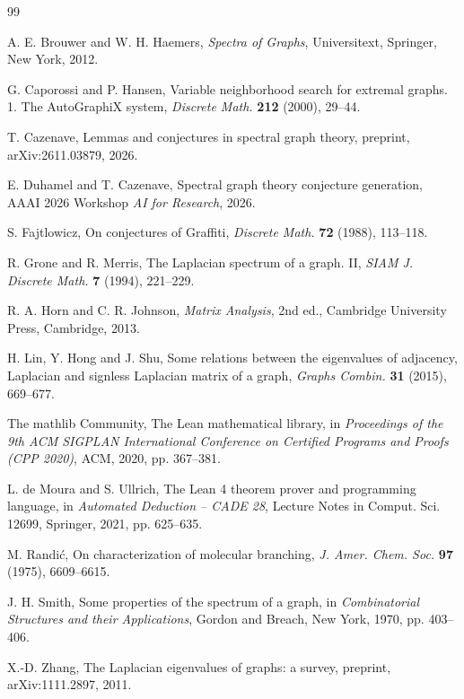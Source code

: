 \documentclass[11pt]{amsart}
\theoremstyle{definition}
\theoremstyle{remark}
\begin{document}
\begin{thebibliography}{99}

A. E. Brouwer and W. H. Haemers, \emph{Spectra of Graphs}, Universitext, Springer, New York,
2012.

G. Caporossi and P. Hansen, Variable neighborhood search for extremal graphs. 1. The
AutoGraphiX system, \emph{Discrete Math.} \textbf{212} (2000), 29--44.

T. Cazenave, Lemmas and conjectures in spectral graph theory, preprint, arXiv:2611.03879,
2026.

E. Duhamel and T. Cazenave, Spectral graph theory conjecture generation, AAAI 2026 Workshop
\emph{AI for Research}, 2026.

S. Fajtlowicz, On conjectures of Graffiti, \emph{Discrete Math.} \textbf{72} (1988), 113--118.

R. Grone and R. Merris, The Laplacian spectrum of a graph. II, \emph{SIAM J. Discrete Math.}
\textbf{7} (1994), 221--229.

R. A. Horn and C. R. Johnson, \emph{Matrix Analysis}, 2nd ed., Cambridge University Press,
Cambridge, 2013.

H. Lin, Y. Hong and J. Shu, Some relations between the eigenvalues of adjacency, Laplacian and
signless Laplacian matrix of a graph, \emph{Graphs Combin.} \textbf{31} (2015), 669--677.

The mathlib Community, The Lean mathematical library, in \emph{Proceedings of the 9th ACM SIGPLAN
International Conference on Certified Programs and Proofs (CPP 2020)}, ACM, 2020, pp. 367--381.

L. de Moura and S. Ullrich, The Lean 4 theorem prover and programming language, in
\emph{Automated Deduction -- CADE 28}, Lecture Notes in Comput. Sci. 12699, Springer, 2021,
pp. 625--635.

M. Randi\'c, On characterization of molecular branching, \emph{J. Amer. Chem. Soc.} \textbf{97}
(1975), 6609--6615.

J. H. Smith, Some properties of the spectrum of a graph, in \emph{Combinatorial Structures and
their Applications}, Gordon and Breach, New York, 1970, pp. 403--406.

X.-D. Zhang, The Laplacian eigenvalues of graphs: a survey, preprint, arXiv:1111.2897, 2011.

\end{thebibliography}
\end{document}
